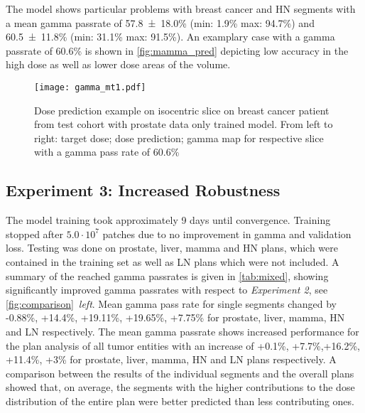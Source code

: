 The model shows particular problems with breast cancer and \acs{HN} segments with a mean gamma passrate of 57.8~±~18.0\% (min: 1.9\% max: 94.7\%) and 60.5~±~11.8\% (min: 31.1\% max: 91.5\%). 
An examplary case with a gamma passrate of 60.6\% is shown in \autoref{fig:mamma_pred} depicting low accuracy in the high dose as well as lower dose areas of the volume.


\begin{figure}
    \centering
    \texttt{[image: gamma\_mt1.pdf]}
    \caption{
        Dose prediction example on isocentric slice on breast cancer patient from test cohort with prostate data only trained model. 
        From left to right: target dose; dose prediction; gamma map for respective slice with a gamma pass rate of 60.6\%}\label{fig:mamma_pred}
\end{figure}

\subsection{Experiment 3: Increased Robustness}

The model training took approximately 9 days until convergence. Training stopped after $5.0\cdot10^7$ patches due to no improvement in gamma and validation loss. 
Testing was done on prostate, liver, mamma and \acs{HN} plans, which were contained in the training set as well as \acs{LN} plans which were not included. 
A summary of the reached gamma passrates is given in \autoref{tab:mixed}, showing significantly improved gamma passrates with respect to \emph{Experiment 2}, see \autoref{fig:comparison}~\emph{left}.
Mean gamma pass rate for single segments changed by -0.88\%, +14.4\%, +19.11\%, +19.65\%, +7.75\% for prostate, liver, mamma, \acs{HN} and \acs{LN} respectively. 
The mean gamma passrate shows increased performance for the plan analysis of all tumor entities with an increase of  +0.1\%,  +7.7\%,+16.2\%, +11.4\%, +3\% for prostate, liver, mamma, \acs{HN} and \acs{LN} plans respectively. 
A comparison between the results of the individual segments and the overall plans showed that, on average, the segments with the higher contributions to the dose distribution of the entire plan were better predicted than less contributing ones. 

